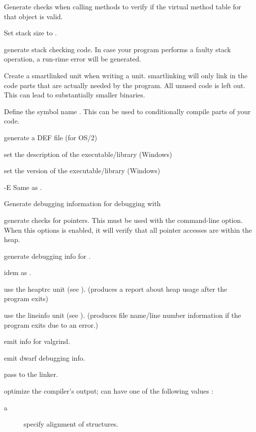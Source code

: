 \begin{description}
\item [-CR]  Generate checks when calling methods to verify
if the virtual method table for that object is valid.
\item [-Csxxx]  Set stack size to .
\item [-Ct]  generate stack checking code. In case your program
performs a faulty stack operation, a run-rime error will be generated.
\item [-CX]  Create a smartlinked unit when writing a unit.
smartlinking will only link in the code parts that are actually needed by
the program. All unused code is left out. This can lead to substantially
smaller binaries.
\item [-dxxx]  Define the symbol name . This can be used
to conditionally compile parts of your code.
\item [-D] generate a DEF file (for OS/2)
\item [-Dd] set the description of the executable/library (Windows)
\item [-Dv] set the version of the executable/library (Windows)
\item {-E}  Same as .
\item [-g]  Generate debugging information for debugging with
\item [-gc] generate checks for pointers. This must be used with the
 command-line option. When this options is enabled, it will verify 
that all pointer accesses are within the heap.
\item [-gd]  generate debugging info for .
\item [-gg] idem as .
\item [-gh] use the heaptrc unit (see \unitsref). (produces a report
about heap usage after the program exits)
\item [-gl] use the lineinfo unit (see \unitsref). (produces file
name/line number information if the program exits due to an error.)
\item [-gv] emit info for valgrind.
\item [-gw] emit dwarf debugging info.
\item[-kxxx] pass  to the linker. 
\item[-Oxxx]  optimize the compiler's output;  can have one
of the following values :
\begin{description}
\item[a] specify alignment of structures.

\end{description}
\end{description}
